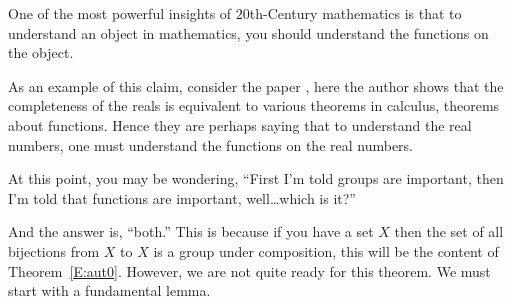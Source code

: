 \documentclass{ximera}
\begin{document}
One of the most powerful insights of $20$th-Century mathematics is that
to understand an object in mathematics, you should understand the
functions on the object.

As an example of this claim, consider the paper , here the
author shows that the completeness of the reals is equivalent to
various theorems in calculus, theorems about functions. Hence they are
perhaps saying that to understand the real numbers, one must
understand the functions on the real numbers.

At this point, you may be wondering, ``First I'm told groups are
important, then I'm told that functions are important, well\dots which
is it?''

And the answer is, ``both.'' This is because if you have a set $X$
then the set of all bijections from $X$ to $X$ is a group under
composition, this will be the content of
Theorem~\ref{E:aut0}. However, we are not quite ready for this
theorem. We must start with a fundamental lemma.
\end{document}
